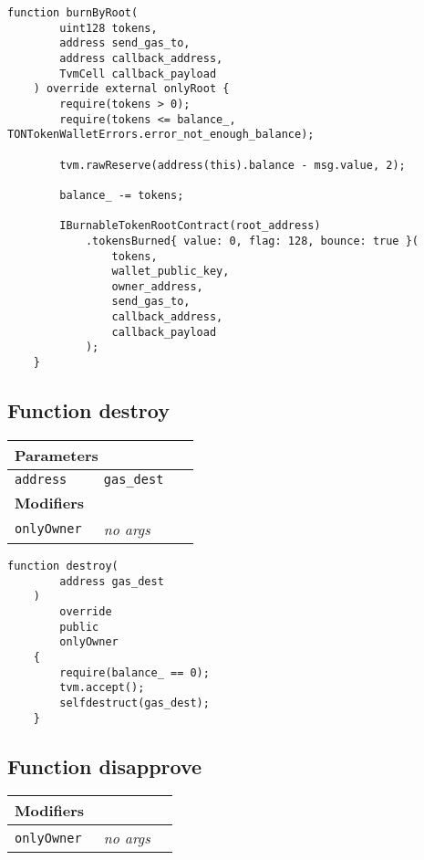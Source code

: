 \vspace{2cm}

\begin{lstlisting}[firstnumber=520]
    function burnByRoot(
        uint128 tokens,
        address send_gas_to,
        address callback_address,
        TvmCell callback_payload
    ) override external onlyRoot {
        require(tokens > 0);
        require(tokens <= balance_, TONTokenWalletErrors.error_not_enough_balance);

        tvm.rawReserve(address(this).balance - msg.value, 2);

        balance_ -= tokens;

        IBurnableTokenRootContract(root_address)
            .tokensBurned{ value: 0, flag: 128, bounce: true }(
                tokens,
                wallet_public_key,
                owner_address,
                send_gas_to,
                callback_address,
                callback_payload
            );
    }
\end{lstlisting}

\subsection{Function destroy}


\ifsoltables
\noindent\begin{tabular}{|l|l|p{5cm}|}\hline
\multicolumn{3}{|l|}{\bf Parameters}\\\hline
\tt address & \tt gas\_{}dest &\\\hline
\multicolumn{3}{|l|}{\bf Modifiers}\\\hline
\tt onlyOwner & {\em no args} &\\\hline
\end{tabular}
\fi

\vspace{2cm}

\begin{lstlisting}[firstnumber=584]
    function destroy(
        address gas_dest
    )
        override
        public
        onlyOwner
    {
        require(balance_ == 0);
        tvm.accept();
        selfdestruct(gas_dest);
    }
\end{lstlisting}

\subsection{Function disapprove}


\ifsoltables
\noindent\begin{tabular}{|l|l|p{5cm}|}\hline
\multicolumn{3}{|l|}{\bf Modifiers}\\\hline
\tt onlyOwner & {\em no args} &\\\hline
\end{tabular}
\fi

